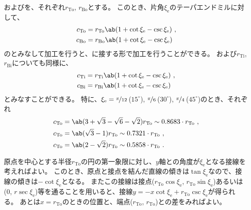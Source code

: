 \TopEndFaceOutRChamferRadius および\BottomEndFaceOutRChamferRadius を、それぞれ$r_\mathrm{To}$, $r_\mathrm{Bo}$とする。
このとき、片角$\xi_\mathrm e$のテーパエンドミルに対して、
\begin{align*}
  c_\mathrm{To} &= r_\mathrm{To}\ab(1+\cot\xi_\mathrm e-\csc\xi_\mathrm e)\ ,\\
  c_\mathrm{Bo} &= r_\mathrm{Bo}\ab(1+\cot\xi_\mathrm e-\csc\xi_\mathrm e)
\end{align*}
の\EndFaceOutCChamferLength とみなして加工を行うと、\EndFaceRChamfer に接する形で加工を行うことができる。
\TopEndFaceInRChamferRadius および\BottomEndFaceInRChamferRadius$r_\mathrm{Ti}$, $r_\mathrm{Bi}$についても同様に、
\begin{align*}
  c_\mathrm{Ti} &= r_\mathrm{Ti}\ab(1+\cot\xi_\mathrm e-\csc\xi_\mathrm e)\ ,\\
  c_\mathrm{Bi} &= r_\mathrm{Bi}\ab(1+\cot\xi_\mathrm e-\csc\xi_\mathrm e)
\end{align*}
とみなすことができる。
特に、$\xi_\mathrm e = \nicefrac\pi{12}$\,($15^\circ$), $\nicefrac\pi6$\,($30^\circ$), $\nicefrac\pi4$\,($45^\circ$)のとき、それぞれ
\begin{align*}
  c_\mathrm{To} &= \ab(3+\sqrt3-\sqrt6-\sqrt2)r_\mathrm{To} \sim 0.8683\cdot r_\mathrm{To}\ ,\\
  c_\mathrm{To} &= \ab(\sqrt3-1)r_\mathrm{To} \sim 0.7321\cdot r_\mathrm{To}\ ,\\
  c_\mathrm{To} &= \ab(2-\sqrt2)r_\mathrm{To} \sim 0.5858\cdot r_\mathrm{To}\ .
\end{align*}
\begin{hosoku}
原点を中心とする半径$r_\mathrm{To}$の円の第一象限に対し、$y$軸との角度が$\xi_\mathrm e$となる接線を考えればよい。
このとき、原点と接点を結んだ直線の傾きは$\tan\xi_\mathrm e$なので、接線の傾きは$-\cot\xi_\mathrm e$となる。
またこの接線は接点($r_\mathrm{To}\cos\xi_\mathrm e$, $r_\mathrm{To}\sin\xi_\mathrm e$)あるいは(0, $r\sec\xi_\mathrm e$)等を通ることを用いると、接線$y = -x\cot\xi_\mathrm e+r_\mathrm{To}\csc\xi_\mathrm e$が得られる。
あとは$x = r_\mathrm{To}$のときの位置と、端点($r_\mathrm{To}$, $r_\mathrm{To}$)との差をみればよい。
\end{hosoku}



